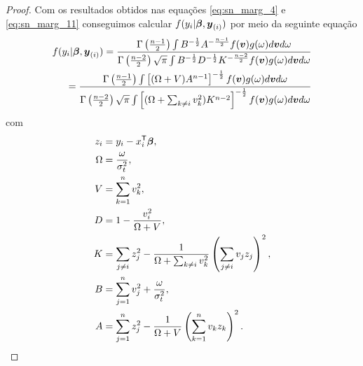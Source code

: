 \begin{proof}
Com os resultados obtidos nas equações \eqref{eq:sn_marg_4} e \eqref{eq:sn_marg_11} conseguimos calcular $f(y_i|{\boldsymbol{\beta}},{\boldsymbol{y}_{(i)}})$ por meio da seguinte equação
\begin{equation}\label{eq:sn_marg_12}
\begin{split}
f(y_i|{\boldsymbol{\beta}},{\boldsymbol{y}_{(i)}}) = \frac{
\Gamma\left(\frac{n-1}{2}\right)\int B^{-\frac{1}{2}} A^{-\frac{n-1}{2}}f({\boldsymbol{v}})g(\omega)d{\boldsymbol{v}} d\omega
}{
\Gamma\left(\frac{n-2}{2}\right) \sqrt{\pi}\int B^{-\frac{1}{2}}D^{-\frac{1}{2}} K^{-\frac{n-2}{2}}f({\boldsymbol{v}})g(\omega)d{\boldsymbol{v}} d\omega 
} \\
{} = \frac{
\Gamma\left(\frac{n-1}{2}\right)\int \left[(\Omega+V) A^{n-1}\right]^{-\frac{1}{2}}f({\boldsymbol{v}})g(\omega)d{\boldsymbol{v}} d\omega
}{
\Gamma\left(\frac{n-2}{2}\right) \sqrt{\pi}\int \left[ (\Omega + \sum_{k \neq i}v_k^2) K^{n-2}\right]^{-\frac{1}{2}}f({\boldsymbol{v}})g(\omega)d{\boldsymbol{v}} d\omega 
}
\end{split}
\end{equation}
com 
\begin{align}
z_i & = y_i - x_i^{\mathsf{T}}{\boldsymbol{\beta}} \notag ,\\
\Omega & = \frac{\omega}{\sigma^2_t} \notag ,\\
V & = \sum_{k=1}^nv_k^2 \notag ,\\
D & = 1-\frac{v_i^2}{\Omega+V} \notag ,\\
K & = \sum_{j\neq i}z_j^2-\frac{1}{\Omega+\sum_{k \neq i}v_k^2}\left(\sum_{j\neq i}v_jz_j\right)^2  ,\\
B & = \sum_{j=1}^nv_j^2+\frac{\omega}{\sigma^2_t} \notag ,\\
A & = \sum_{j=1}^nz_j^2 - \frac{1}{\Omega + V}\left(\sum_{k=1}^nv_kz_k\right)^2 \notag .
\end{align}


\end{proof}
